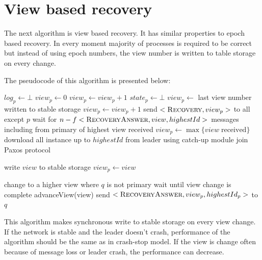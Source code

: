 \section{View based recovery}
\label{sec:view_ss}

The next algorithm is view based recovery. It has similar properties to epoch based recovery. In every moment majority of processes is required to be correct but instead of using epoch numbers, the view number is written to table storage on every change. 

The pseudocode of this algorithm is presented below: 

\begin{algorithmic}[1]
  \INIT{}
    \STATE $log_p \leftarrow \bot$
    \STATE $view_p \leftarrow 0$
      \STATE $view_p \leftarrow view_p + 1$
    \ENDIF
    \STATE $state_p \leftarrow \bot$
    \STATE
      \STATE $view_p \leftarrow$ last view number written to stable storage
        \STATE $view_p \leftarrow view_p + 1$
      \ENDIF
      \STATE send $<\recovery[], view_p>$ to all except $p$
      \STATE wait for $n-f <\recoveryAnswer[], view, highestId>$ messages including from primary of highest view received
      \STATE $view_p \leftarrow \max\{{ view \; \mathrm{received}}\}$
      \STATE download all instance up to $highestId$ from leader using catch-up module
    \ENDIF
    \STATE
    \STATE join Paxos protocol
  \ENDINIT

  \vspace{1em}
    \STATE write $view$ to stable storage
    \STATE $view_p \leftarrow view$
  \ENDPROC

  \vspace{1em}
      \STATE change to a higher view where $q$ is not primary
      \STATE wait until view change is complete
    \ENDIF
      \STATE advanceView(view)
    \ENDIF
    \STATE send $<\recoveryAnswer[], view_p, highestId_p>$ to $q$
  \ENDUPON
\end{algorithmic}

This algorithm makes synchronous write to stable storage on every view change. If the network is stable and the leader doesn't crash, performance of the algorithm should be the same as in crash-stop model. If the view is change often because of message loss or leader crash, the performance can decrease.

